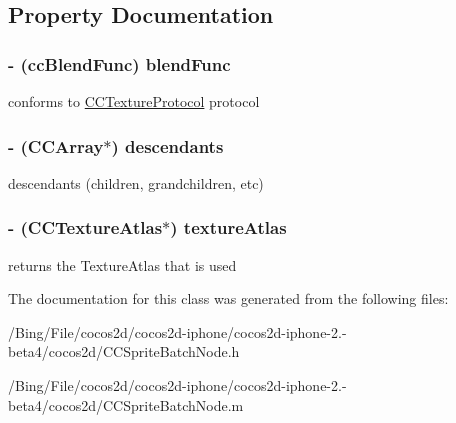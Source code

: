 \subsection{Property Documentation}
\hypertarget{interface_c_c_sprite_batch_node_a80261f62d72cb2181c635a7225ac2ee4}{
\subsubsection[{blend\-Func}]{\setlength{\rightskip}{0pt plus 5cm}-\/ ({\bf cc\-Blend\-Func}) {\bf blend\-Func}}}\label{interface_c_c_sprite_batch_node_a80261f62d72cb2181c635a7225ac2ee4}
conforms to \hyperlink{protocol_c_c_texture_protocol-p}{C\-C\-Texture\-Protocol} protocol \hypertarget{interface_c_c_sprite_batch_node_ab80aa33e4b89d43d183a1e4beecdbb41}{
\subsubsection[{descendants}]{\setlength{\rightskip}{0pt plus 5cm}-\/ ({\bf C\-C\-Array}$\ast$) {\bf descendants}}}\label{interface_c_c_sprite_batch_node_ab80aa33e4b89d43d183a1e4beecdbb41}
descendants (children, grandchildren, etc) \hypertarget{interface_c_c_sprite_batch_node_a490e279dec5d00f1101a27c9e020bb74}{
\subsubsection[{texture\-Atlas}]{\setlength{\rightskip}{0pt plus 5cm}-\/ ({\bf C\-C\-Texture\-Atlas}$\ast$) {\bf texture\-Atlas}}}\label{interface_c_c_sprite_batch_node_a490e279dec5d00f1101a27c9e020bb74}
returns the Texture\-Atlas that is used 

The documentation for this class was generated from the following files\-:\begin{DoxyCompactItemize}
\item 
/\-Bing/\-File/cocos2d/cocos2d-\/iphone/cocos2d-\/iphone-\/2.-\/beta4/cocos2d/C\-C\-Sprite\-Batch\-Node.\-h\item 
/\-Bing/\-File/cocos2d/cocos2d-\/iphone/cocos2d-\/iphone-\/2.-\/beta4/cocos2d/C\-C\-Sprite\-Batch\-Node.\-m\end{DoxyCompactItemize}
